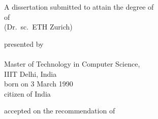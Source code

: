 \begin{titlepage}
    \begin{center}
        \large
        \begingroup
        \endgroup

        \hfill

        \vfill

        \begingroup
            \spacedallcaps{\myTitle}
        \endgroup

        \vfill

        \begingroup
            A dissertation submitted to attain the degree of\\
            \vspace{0.5em}
            of
             \\
            (Dr.\ sc.\ ETH Zurich)
        \endgroup

        \vfill

        \begingroup
            presented by\\
            \vspace{0.5em}
            \spacedlowsmallcaps{\myName}\\
            Master of Technology in Computer Science,\\ IIIT Delhi, India \\
            \vspace{0.5em}
            born on 3 March 1990\\
            citizen of India
        \endgroup

        \vfill

        \begingroup
            accepted on the recommendation of\\
            \vspace{0.5em}

        \endgroup

        \vfill

        \myTime%

        \vfill
    \end{center}
\end{titlepage}
